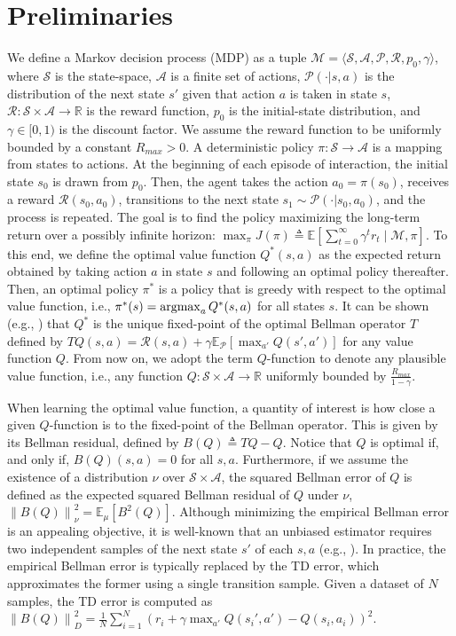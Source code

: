 \documentclass{article}
\newcommand{\argmax}{\operatornamewithlimits{argmax}}
\newcommand{\norm}[1]{\left\lVert #1 \right\rVert}
\begin{document}
\section{Preliminaries}

We define a Markov decision process (MDP) as a tuple $\mathcal{M} = \langle \mathcal{S},\mathcal{A},\mathcal{P},\mathcal{R},p_0,\gamma\rangle$, where $\mathcal{S}$ is the state-space, $\mathcal{A}$ is a finite set of actions, $\mathcal{P}(\cdot | s,a)$ is the distribution of the next state $s'$ given that action $a$ is taken in state $s$, $\mathcal{R}: \mathcal{S}\times\mathcal{A}\rightarrow\mathbb{R}$ is the reward function, $p_0$ is the initial-state distribution, and $\gamma\in [0,1)$ is the discount factor. We assume the reward function to be uniformly bounded by a constant $R_{max}>0$. A deterministic policy $\pi : \mathcal{S} \rightarrow \mathcal{A}$ is a mapping from states to actions. At the beginning of each episode of interaction, the initial state $s_0$ is drawn from $p_0$. Then, the agent takes the action $a_0 = \pi(s_0)$, receives a reward $\mathcal{R}(s_0,a_0)$, transitions to the next state $s_1 \sim \mathcal{P}(\cdot | s_0,a_0)$, and the process is repeated. The goal is to find the policy maximizing the long-term return over a possibly infinite horizon: $\max_{\pi}J(\pi)\triangleq\mathbb{E}[\sum_{t=0}^{\infty} \gamma^t r_t \mid \mathcal{M},\pi]$. To this end, we define the optimal value function $Q^*(s,a)$ as the expected return obtained by taking action $a$ in state $s$ and following an optimal policy thereafter. Then, an optimal policy $\pi^*$ is a policy that is greedy with respect to the optimal value function, i.e., $\pi^*(s) = \argmax_a Q^*(s,a)$ for all states $s$. It can be shown (e.g., \cite{puterman1994markov}) that $Q^*$ is the unique fixed-point of the optimal Bellman operator $T$ defined by $TQ(s,a) = \mathcal{R}(s,a) + \gamma\mathbb{E}_{\mathcal{P}}[\max_{a'}Q(s',a')]$ for any value function $Q$. From now on, we adopt the term $Q$-function to denote any plausible value function, i.e., any function $Q : \mathcal{S}\times\mathcal{A} \rightarrow \mathbb{R}$ uniformly bounded by $\frac{R_{max}}{1-\gamma}$.

When learning the optimal value function, a quantity of interest is how close a given $Q$-function is to the fixed-point of the Bellman operator. This is given by its Bellman residual, defined by $B(Q) \triangleq TQ - Q$. Notice that $Q$ is optimal if, and only if, $B(Q)(s,a) = 0$ for all $s,a$. Furthermore, if we assume the existence of a distribution $\nu$ over $\mathcal{S}\times\mathcal{A}$, the squared Bellman error of $Q$ is defined as the expected squared Bellman residual of $Q$ under $\nu$, $\norm{B(Q)}_{\nu}^2=\mathbb{E}_{\mu}\left[ B^2(Q) \right]$. Although minimizing the empirical Bellman error is an appealing objective, it is well-known that an unbiased estimator requires two independent samples of the next state $s'$ of each $s,a$ (e.g., \cite{} ). In practice, the empirical Bellman error is typically replaced by the TD error, which approximates the former using a single transition sample. Given a dataset of $N$ samples, the TD error is computed as $\norm{B(Q)}_{D}^2 = \frac{1}{N}\sum_{i=1}^N (r_i + \gamma \max_{a'} Q(s_i',a') - Q(s_i,a_i))^2$.
\end{document}
